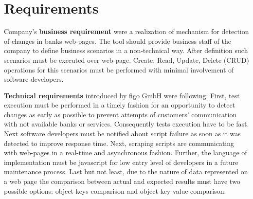 	
	
\section{Requirements}
\label{sec:reqiorements}

Company's \textbf{business requirement} were a realization of mechanism for detection of changes in banks web-pages. 
The tool should provide business staff of the company to define business scenarios in a non-technical way. After definition such scenarios must be executed over web-page. Create, Read, Update, Delete (CRUD) operations for this scenarios must be performed with minimal involvement of software developers.

\textbf{Technical requirements} introduced by figo GmbH were following: First, test execution must be performed in a timely fashion for an opportunity to detect changes as early as possible to prevent attempts of customers' communication with not available banks or services. Consequently tests execution have to be fast. 
Next software developers must be notified about script failure as soon as it was detected to improve response time. 
Next, scraping scripts are communicating with web-pages in a real-time and asynchronous fashion. 
Further, the language of implementation must be javascript for low entry level of developers in a future maintenance process. 
Last but not least, due to the nature of data represented on a web page the comparison between actual and expected results must have two possible options: object keys comparison and object key-value comparison.








